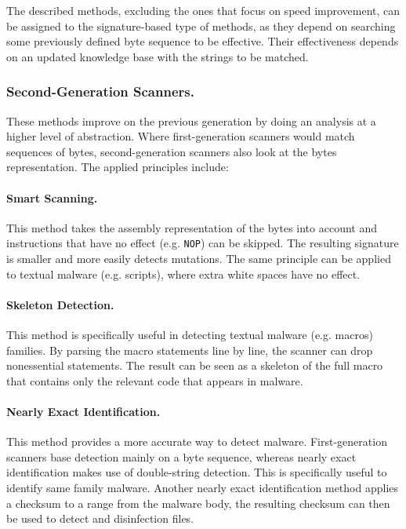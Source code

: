 The described methods, excluding the ones that focus on speed improvement, can be assigned to the signature-based type of methods, as they depend on searching some previously defined byte sequence to be effective. Their effectiveness depends on an updated knowledge base with the strings to be matched.

\subsubsection{Second-Generation Scanners.} These methods improve on the previous generation by doing an analysis at a higher level of abstraction. Where first-generation scanners would match sequences of bytes, second-generation scanners also look at the bytes representation. The applied principles include:

\paragraph{Smart Scanning.} This method takes the assembly representation of the bytes into account and instructions that have no effect (e.g. \texttt{NOP}) can be skipped. The resulting signature is smaller and more easily detects mutations. The same principle can be applied to textual malware (e.g. scripts), where extra white spaces have no effect.

\paragraph{Skeleton Detection.} This method is specifically useful in detecting textual malware (e.g. macros) families. By parsing the macro statements line by line, the scanner can drop nonessential statements. The result can be seen as a skeleton of the full macro that contains only the relevant code that appears in malware.

\paragraph{Nearly Exact Identification.} This method provides a more accurate way to detect malware. First-generation scanners base detection mainly on a byte sequence, whereas nearly exact identification makes use of double-string detection. This is specifically useful to identify same family malware. Another nearly exact identification method applies a checksum to a range from the malware body, the resulting checksum can then be used to detect and disinfection files.


